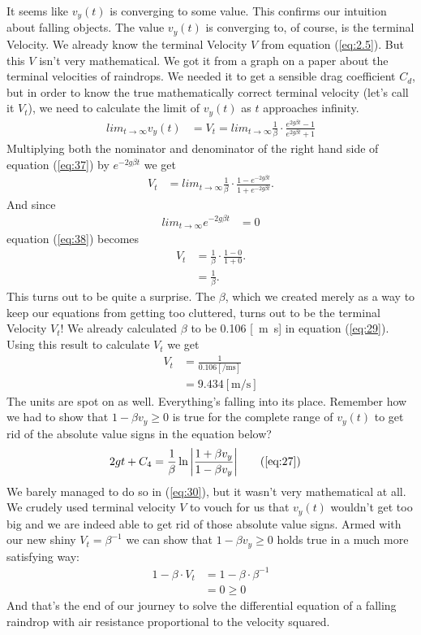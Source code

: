 \documentclass[paper=a4, fontsize=11pt]{scrartcl} %
\numberwithin{equation}{section} %
\numberwithin{figure}{section} %
\numberwithin{table}{section} %
\begin{document}
It seems like $v_y(t)$ is converging to some value. This confirms our intuition about falling objects.
The value $v_y(t)$ is converging to, of course, is the terminal Velocity.
We already know the terminal Velocity $V$ from equation (\ref{eq:2.5}). But this $V$ isn't very mathematical. 
We got it from a graph on a paper about the terminal velocities of raindrops.
We needed it to get a sensible drag coefficient $C_d$, but in order to know the true 
mathematically correct terminal velocity (let's call it $V_t$), we need to calculate the limit 
of $v_y(t)$ as $t$ approaches infinity.
\begin{align} 
lim_{t\to\infty} v_y(t) &= V_t = lim_{t\to\infty} \frac{1}{\beta} \cdot \frac{e^{2 g \beta t} - 1}{e^{2 g \beta t} + 1} \label{eq:37}
\end{align}
Multiplying both the nominator and denominator of the right hand side of equation (\ref{eq:37}) by $e^{-2 g \beta t}$ we get
\begin{align} 
V_t &= lim_{t\to\infty} \frac{1}{\beta} \cdot \frac{1 - e^{-2 g \beta t}}{1 + e^{-2 g \beta t}}. \label{eq:38}
\end{align}
And since 
\begin{align} 
lim_{t\to\infty} e^{-2 g \beta t} &= 0
\end{align}
equation (\ref{eq:38}) becomes
\begin{align} 
V_t &=  \frac{1}{\beta} \cdot \frac{1 - 0}{1 + 0}. \label{eq:39} \\
    &=  \frac{1}{\beta} . \label{eq:40}
\end{align}
This turns out to be quite a surprise. The $\beta$, which we created merely as a way to keep our equations from getting too cluttered,
turns out to be the terminal Velocity $V_t$! We already calculated $\beta$ to be 0.106 [\si{\per\meter\second}] in equation (\ref{eq:29}).
Using this result to calculate $V_t$ we get
\begin{align} 
V_t &=  \frac{1}{0.106 [\si{\per\meter\second}]} \\
    &=  9.434 [\si{\meter\per\second}]
\end{align}
The units are spot on as well. Everything's falling into its place. Remember how we had to show that $1 - \beta v_y \geq 0$ is true
for the complete range of $v_y(t)$ to get rid of the absolute value signs in the equation below?
\begin{align} 
2g t + C_4 &=  \frac{1}{\beta} \ln{\left|\frac{1 + \beta v_y}{1 - \beta v_y} \right|} \tag{\ref{eq:27}}
\end{align}
We barely managed to do so in (\ref{eq:30}), but it wasn't very mathematical at all. We crudely used terminal velocity $V$ to vouch for us
that $v_y(t)$ wouldn't get too big and we are indeed able to get rid of those absolute value signs.
Armed with our new shiny $V_t = \beta^{-1}$ we can show that $1 - \beta v_y \geq 0$ holds true in a much more satisfying way:
\begin{align} 
  1 - \beta \cdot V_t &= 1 - \beta \cdot \beta^{-1} \\
  &= 0 \geq 0
\end{align}
And that's the end of our journey to solve the differential equation of a falling raindrop with air resistance proportional to the velocity squared. 
\end{document}
